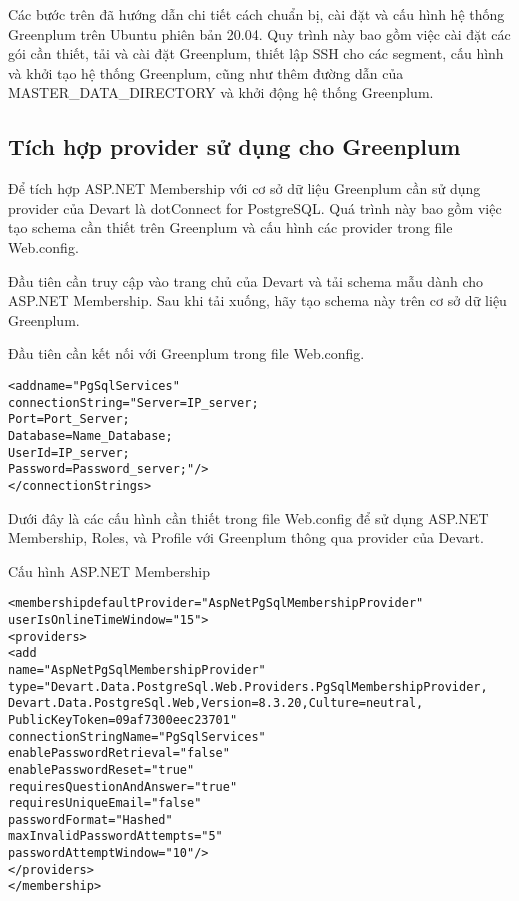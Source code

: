 Các bước trên đã hướng dẫn chi tiết cách chuẩn bị, cài đặt và cấu hình hệ thống Greenplum trên Ubuntu phiên bản 20.04. Quy trình này bao gồm việc cài đặt các gói cần thiết, tải và cài đặt Greenplum, thiết lập SSH cho các segment, cấu hình và khởi tạo hệ thống Greenplum, cũng như thêm đường dẫn của MASTER\_DATA\_DIRECTORY và khởi động hệ thống Greenplum.



\subsection{Tích hợp provider sử dụng cho Greenplum}

Để tích hợp ASP.NET Membership với cơ sở dữ liệu Greenplum cần sử dụng provider của Devart là dotConnect for PostgreSQL. Quá trình này bao gồm việc tạo schema cần thiết trên Greenplum và cấu hình các provider trong file Web.config.

Đầu tiên cần truy cập vào trang chủ của Devart và tải schema mẫu dành cho ASP.NET Membership. Sau khi tải xuống, hãy tạo schema này trên cơ sở dữ liệu Greenplum.

Đầu tiên cần kết nối với Greenplum trong file Web.config.


\begin{mdframed}[backgroundcolor=white, linecolor=black, roundcorner=5pt]
\begin{alltt}
<add name="PgSqlServices" 
     connectionString="Server=IP_server;
                       Port=Port_Server;
                       Database=Name_Database;
                       User Id=IP_server;
                       Password=Password_server;"/>
</connectionStrings>
\end{alltt}
\end{mdframed}

Dưới đây là các cấu hình cần thiết trong file Web.config để sử dụng ASP.NET Membership, Roles, và Profile với Greenplum thông qua provider của Devart.

Cấu hình ASP.NET Membership
\begin{mdframed}[backgroundcolor=white, linecolor=black, roundcorner=5pt]
\begin{alltt}
<membership defaultProvider="AspNetPgSqlMembershipProvider"
            userIsOnlineTimeWindow="15">
  <providers>
    <add
      name="AspNetPgSqlMembershipProvider"
      type="Devart.Data.PostgreSql.Web.Providers.PgSqlMembershipProvider,
            Devart.Data.PostgreSql.Web, Version=8.3.20, Culture=neutral,
            PublicKeyToken=09af7300eec23701"
      connectionStringName="PgSqlServices"
      enablePasswordRetrieval="false"
      enablePasswordReset="true"
      requiresQuestionAndAnswer="true"
      requiresUniqueEmail="false"
      passwordFormat="Hashed"
      maxInvalidPasswordAttempts="5"
      passwordAttemptWindow="10" />
  </providers>
</membership>
\end{alltt}
\end{mdframed}

